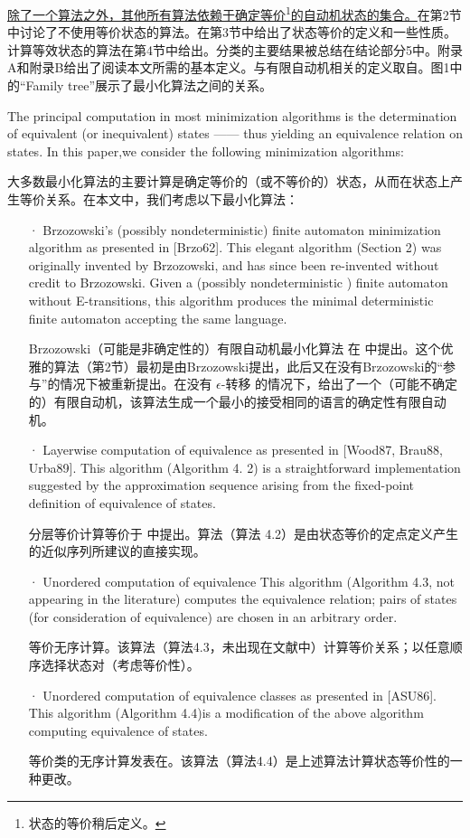 \uline{除了一个算法之外，其他所有算法依赖于确定等价}\footnote{状态的等价稍后定义。}\uline{的自动机状态的集合。}在第2节中讨论了不使用等价状态的算法。在第3节中给出了状态等价的定义和一些性质。计算等效状态的算法在第4节中给出。分类的主要结果被总结在结论部分5中。附录A和附录B给出了阅读本文所需的基本定义。与有限自动机相关的定义取自\cite{Wats93}。图1中的“Family tree”展示了最小化算法之间的关系。

The principal computation in most minimization algorithms is the determination of equivalent (or inequivalent) states —— thus yielding an equivalence relation on states. In this paper,we consider the following minimization algorithms:

大多数最小化算法的主要计算是确定等价的（或不等价的）状态，从而在状态上产生等价关系。在本文中，我们考虑以下最小化算法：

\begin{itemize}
    \item[·] Brzozowski's (possibly nondeterministic) finite automaton minimization algorithm as presented in [Brzo62]. This elegant algorithm (Section 2) was originally invented by Brzozowski, and has since been re-invented without credit to Brzozowski. Given a (possibly nondeterministic ) finite automaton without E-transitions, this algorithm produces the minimal deterministic finite automaton accepting the same language.
    
    Brzozowski（可能是非确定性的）有限自动机最小化算法 在 \cite{Brzo62} 中提出。这个优雅的算法（第2节）最初是由Brzozowski提出，此后又在没有Brzozowski的“参与”的情况下被重新提出。在没有 $\epsilon$-转移 的情况下，给出了一个（可能不确定的）有限自动机，该算法生成一个最小的接受相同的语言的确定性有限自动机。

    \item[·] Layerwise computation of equivalence as presented in [Wood87, \cite{Moor56} Brau88, Urba89]. This algorithm (Algorithm 4. 2) is a straightforward implementation suggested by the approximation sequence arising from the fixed-point definition of equivalence of states. 

    分层等价计算等价于 \cite{Wood87, Moor56, Brau88, Urba89} 中提出。算法（算法 4.2）是由状态等价的定点定义产生的近似序列所建议的直接实现。

    \item[·] Unordered computation of equivalence This algorithm (Algorithm 4.3, not appearing in the literature) computes the equivalence relation; pairs of states (for consideration of equivalence) are chosen in an arbitrary order.

    等价无序计算。该算法（算法4.3，未出现在文献中）计算等价关系；以任意顺序选择状态对（考虑等价性）。

    \item[·] Unordered computation of equivalence classes as presented in [ASU86]. This algorithm (Algorithm 4.4)is a modification of the above algorithm computing equivalence of states.

    等价类的无序计算发表在\cite{ASU86}。该算法（算法4.4）是上述算法计算状态等价性的一种更改。

\end{itemize}


